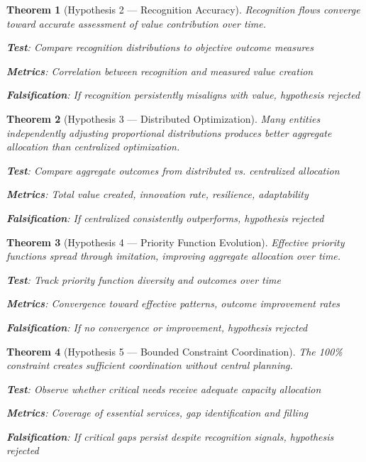 \documentclass[11pt]{article}
\newtheorem{theorem}{Theorem}
\begin{document}
\begin{theorem}[Hypothesis 2 — Recognition Accuracy]
Recognition flows converge toward accurate assessment of value contribution over time.

\textbf{Test}: Compare recognition distributions to objective outcome measures

\textbf{Metrics}: Correlation between recognition and measured value creation

\textbf{Falsification}: If recognition persistently misaligns with value, hypothesis rejected
\end{theorem}

\begin{theorem}[Hypothesis 3 — Distributed Optimization]
Many entities independently adjusting proportional distributions produces better aggregate allocation than centralized optimization.

\textbf{Test}: Compare aggregate outcomes from distributed vs. centralized allocation

\textbf{Metrics}: Total value created, innovation rate, resilience, adaptability

\textbf{Falsification}: If centralized consistently outperforms, hypothesis rejected
\end{theorem}

\begin{theorem}[Hypothesis 4 — Priority Function Evolution]
Effective priority functions spread through imitation, improving aggregate allocation over time.

\textbf{Test}: Track priority function diversity and outcomes over time

\textbf{Metrics}: Convergence toward effective patterns, outcome improvement rates

\textbf{Falsification}: If no convergence or improvement, hypothesis rejected
\end{theorem}

\begin{theorem}[Hypothesis 5 — Bounded Constraint Coordination]
The 100\% constraint creates sufficient coordination without central planning.

\textbf{Test}: Observe whether critical needs receive adequate capacity allocation

\textbf{Metrics}: Coverage of essential services, gap identification and filling

\textbf{Falsification}: If critical gaps persist despite recognition signals, hypothesis rejected
\end{theorem}
\end{document}
